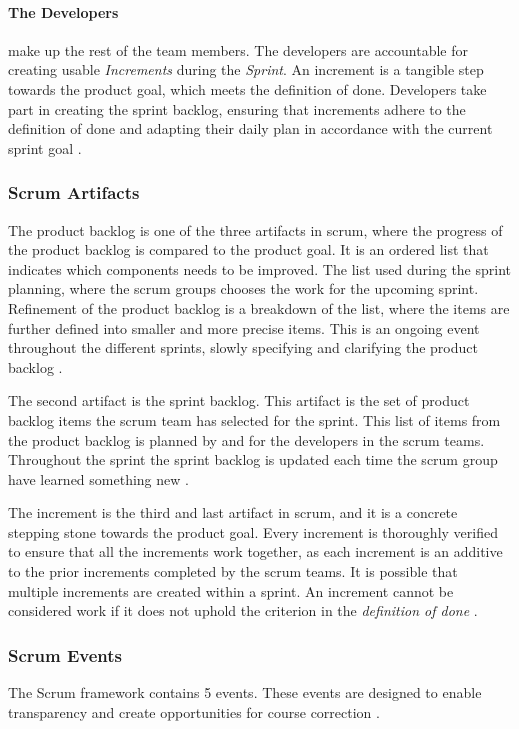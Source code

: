 \paragraph{The Developers}
make up the rest of the team members.
The developers are accountable for creating usable \emph{Increments} during the \emph{Sprint}. 
An increment is a tangible step towards the product goal, which meets the definition of done. 
Developers take part in creating the sprint backlog, ensuring that increments adhere to the definition of done and adapting their daily plan in accordance with the current sprint goal \cite{schwaber_sutherland_2022}.

\subsubsection{Scrum Artifacts}
The product backlog is one of the three artifacts in scrum, where the progress of the product backlog is compared to the product goal.
It is an ordered list that indicates which components needs to be improved.
The list used during the sprint planning, where the scrum groups chooses the work for the upcoming sprint.
Refinement of the product backlog is a breakdown of the list, where the items are further defined into smaller and more precise items.
This is an ongoing event throughout the different sprints, slowly specifying and clarifying the product backlog \cite{schwaber_sutherland_2022}. 

The second artifact is the sprint backlog. 
This artifact is the set of product backlog items the scrum team has selected for the sprint. 
This list of items from the product backlog is planned by and for the developers in the scrum teams. 
Throughout the sprint the sprint backlog is updated each time the scrum group have learned something new \cite{schwaber_sutherland_2022}. 

The increment is the third and last artifact in scrum, and it is a concrete stepping stone towards the product goal.
Every increment is thoroughly verified to ensure that all the increments work together, as each increment is an additive to the prior increments completed by the scrum teams.
It is possible that multiple increments are created within a sprint.
An increment cannot be considered work if it does not uphold the criterion in the \emph{definition of done} \cite{schwaber_sutherland_2022}.

\subsubsection{Scrum Events}
The Scrum framework contains 5 events. 
These events are designed to enable transparency and create opportunities for course correction  \cite{schwaber_sutherland_2022}.

